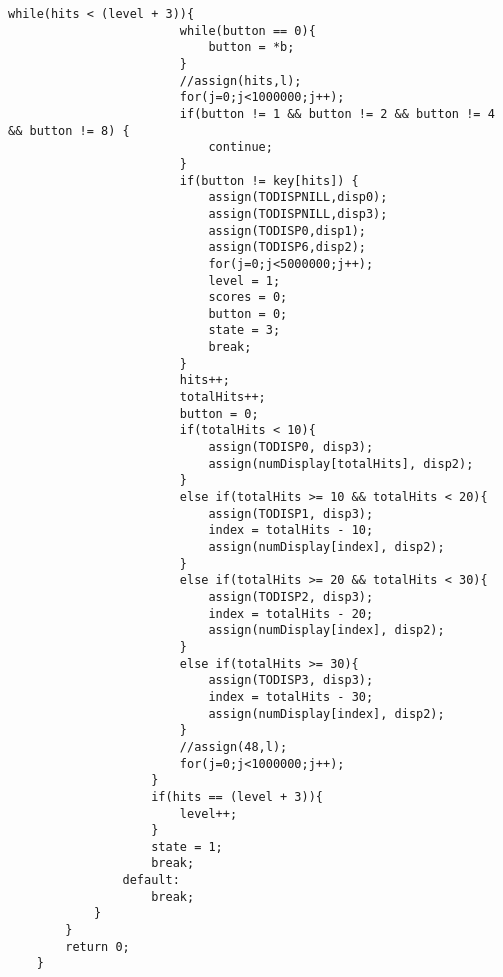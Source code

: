 \begin{lstlisting}[style=CStyle]
                    while(hits < (level + 3)){
                        while(button == 0){
                            button = *b;
                        }
                        //assign(hits,l);
                        for(j=0;j<1000000;j++);
                        if(button != 1 && button != 2 && button != 4 && button != 8) {
                            continue;
                        }
                        if(button != key[hits]) {
                            assign(TODISPNILL,disp0);
                            assign(TODISPNILL,disp3);
                            assign(TODISP0,disp1);
                            assign(TODISP6,disp2);
                            for(j=0;j<5000000;j++);
                            level = 1;
                            scores = 0;
                            button = 0;
                            state = 3;
                            break;
                        }
                        hits++;
                        totalHits++;
                        button = 0;
                        if(totalHits < 10){
                            assign(TODISP0, disp3);
                            assign(numDisplay[totalHits], disp2);    
                        }
                        else if(totalHits >= 10 && totalHits < 20){
                            assign(TODISP1, disp3);
                            index = totalHits - 10;
                            assign(numDisplay[index], disp2);  
                        }
                        else if(totalHits >= 20 && totalHits < 30){
                            assign(TODISP2, disp3);
                            index = totalHits - 20;
                            assign(numDisplay[index], disp2);  
                        }
                        else if(totalHits >= 30){
                            assign(TODISP3, disp3);
                            index = totalHits - 30;
                            assign(numDisplay[index], disp2);                     
                        }
                        //assign(48,l);
                        for(j=0;j<1000000;j++);
                    }
                    if(hits == (level + 3)){
                        level++;
                    }
                    state = 1;
                    break;
                default:
                    break;
            }
        }
        return 0;
    }
    \end{lstlisting}

